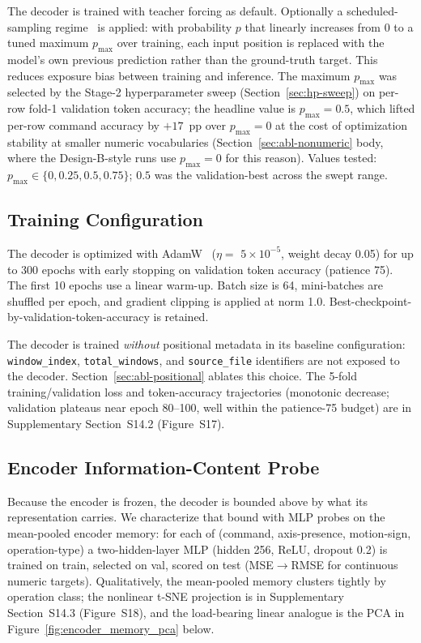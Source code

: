 \documentclass[sensors,article,submit,moreauthors,pdftex]{Definitions/mdpi}
\begin{document}
The decoder is trained with teacher forcing as default. Optionally a scheduled-sampling regime~\cite{scheduled_sampling} is applied: with probability $p$ that linearly increases from $0$ to a tuned maximum $p_{\text{max}}$ over training, each input position is replaced with the model's own previous prediction rather than the ground-truth target. This reduces exposure bias between training and inference. The maximum $p_{\text{max}}$ was selected by the Stage-2 hyperparameter sweep (Section~\ref{sec:hp-sweep}) on per-row fold-1 validation token accuracy; the headline value is $p_{\text{max}}\!=\!0.5$, which lifted per-row command accuracy by $+17$~pp over $p_{\text{max}}\!=\!0$ at the cost of optimization stability at smaller numeric vocabularies (Section~\ref{sec:abl-nonumeric} body, where the Design-B-style runs use $p_{\text{max}}\!=\!0$ for this reason). Values tested: $p_{\text{max}} \in \{0, 0.25, 0.5, 0.75\}$; $0.5$ was the validation-best across the swept range.

\subsection{Training Configuration}
\label{sec:training}

The decoder is optimized with AdamW~\cite{loshchilov2019adamw} ($\eta=$ $5 \times 10^{-5}$, weight decay 0.05) for up to 300 epochs with early stopping on validation token accuracy (patience 75). The first 10 epochs use a linear warm-up. Batch size is 64, mini-batches are shuffled per epoch, and gradient clipping is applied at norm 1.0. Best-checkpoint-by-validation-token-accuracy is retained.

The decoder is trained \emph{without} positional metadata in its baseline configuration: \texttt{window\_index}, \texttt{total\_windows}, and \texttt{source\_file} identifiers are not exposed to the decoder. Section~\ref{sec:abl-positional} ablates this choice. The 5-fold training/validation loss and token-accuracy trajectories (monotonic decrease; validation plateaus near epoch 80--100, well within the patience-75 budget) are in Supplementary Section~S14.2 (Figure~S17).

\subsection{Encoder Information-Content Probe}
\label{sec:encoder-probe}

Because the encoder is frozen, the decoder is bounded above by what its representation carries. We characterize that bound with MLP probes on the mean-pooled encoder memory: for each of (command, axis-presence, motion-sign, operation-type) a two-hidden-layer MLP (hidden 256, ReLU, dropout 0.2) is trained on train, selected on val, scored on test (MSE$\to$RMSE for continuous numeric targets). Qualitatively, the mean-pooled memory clusters tightly by operation class; the nonlinear t-SNE projection is in Supplementary Section~S14.3 (Figure~S18), and the load-bearing linear analogue is the PCA in Figure~\ref{fig:encoder_memory_pca} below.
\end{document}
